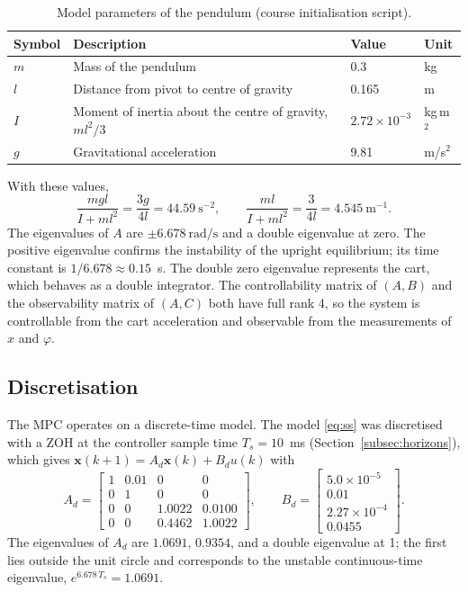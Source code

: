 \begin{table}[ht]
\centering
\caption{Model parameters of the pendulum (course initialisation script).}
\label{tab:params}
\begin{tabular}{llll}
\toprule
Symbol & Description & Value & Unit \\
\midrule
$m$ & Mass of the pendulum & 0.3 & kg \\
$l$ & Distance from pivot to centre of gravity & 0.165 & m \\
$I$ & Moment of inertia about the centre of gravity, $ml^2/3$ & $2.72\times10^{-3}$ & kg\,m$^2$ \\
$g$ & Gravitational acceleration & 9.81 & m/s$^2$ \\
\bottomrule
\end{tabular}
\end{table}

With these values,
\begin{equation}
  \frac{mgl}{I+ml^2} = \frac{3g}{4l} = 44.59~\mathrm{s^{-2}}, \qquad
  \frac{ml}{I+ml^2} = \frac{3}{4l} = 4.545~\mathrm{m^{-1}} .
  \label{eq:numeric}
\end{equation}
The eigenvalues of $A$ are $\pm 6.678~\mathrm{rad/s}$ and a double eigenvalue at
zero. The positive eigenvalue confirms the instability of the upright
equilibrium; its time constant is $1/6.678 \approx 0.15$~s. The double zero
eigenvalue represents the cart, which behaves as a double integrator. The
controllability matrix of $(A,B)$ and the observability matrix of $(A,C)$ both
have full rank 4, so the system is controllable from the cart acceleration and
observable from the measurements of $x$ and $\varphi$.

\subsection{Discretisation}
\label{subsec:discrete}

The \ac{MPC} operates on a discrete-time model. The model \eqref{eq:ss} was
discretised with a \acf{ZOH} at the controller sample time
$T_s = 10$~ms (Section~\ref{subsec:horizons}), which gives
$\mathbf{x}(k+1) = A_d\mathbf{x}(k) + B_d u(k)$ with
\begin{equation}
  A_d = \begin{bmatrix}
    1 & 0.01 & 0 & 0\\
    0 & 1 & 0 & 0\\
    0 & 0 & 1.0022 & 0.0100\\
    0 & 0 & 0.4462 & 1.0022
  \end{bmatrix}, \qquad
  B_d = \begin{bmatrix}
    5.0\times10^{-5}\\ 0.01\\ 2.27\times10^{-4}\\ 0.0455
  \end{bmatrix}.
  \label{eq:AdBd}
\end{equation}
The eigenvalues of $A_d$ are $1.0691$, $0.9354$, and a double eigenvalue at
1; the first lies outside the unit circle and corresponds to the unstable
continuous-time eigenvalue, $e^{6.678\,T_s} = 1.0691$.

